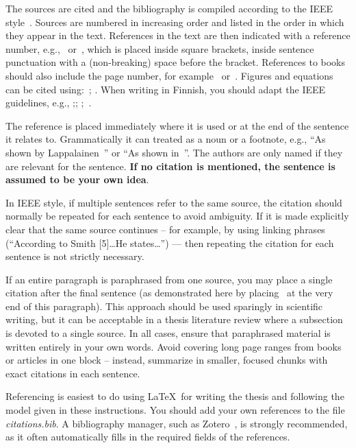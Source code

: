 The sources are cited and the bibliography is compiled according to
the IEEE style~\cite{ieeetransactions}.  Sources are numbered in
increasing order and listed in the order in which they appear in the
text.  References in the text are then indicated with a reference
number, e.g.,~\cite{lappalainen} or~\cite{lappalainen, acta, korpela},
which is placed inside square brackets, inside sentence punctuation
with a (non-breaking) space before the bracket. References to books
should also include the page number, for
example~\cite[p.~15]{lappalainen} or~\cite[pp.~15--17]{lappalainen}.
Figures and equations can be cited using:~\cite[Fig.~3]{lappalainen};
\cite[eq.~(3)]{lappalainen}. When writing in Finnish, you should adapt the IEEE guidelines, e.g., \cite[s.~15]{lappalainen};\cite[s.~15--17]{lappalainen};
\cite[Kuva~3]{lappalainen};~\cite[Yhtälö~(3)]{lappalainen}.

The reference is placed immediately where it is used or at the end of
the sentence it relates to. Grammatically it can treated as a noun or
a footnote, e.g., ``As shown by Lappalainen~\cite{lappalainen}'' or
``As shown in~\cite{lappalainen}''. The authors are only named if they
are relevant for the sentence. \textbf{If no citation is mentioned,
the sentence is assumed to be your own idea}.

In IEEE style, if multiple sentences refer to the same source, the
citation should normally be repeated for each sentence to avoid
ambiguity. If it is made explicitly clear that the same source
continues -- for example, by using linking phrases (“According to Smith
[5]\ldots He states\ldots”) — then repeating the citation for each
sentence is not strictly necessary.

If an entire paragraph is paraphrased from one source, you may place a
single citation after the final sentence (as demonstrated here by
placing~\cite{lappalainen} at the very end of this paragraph). This
approach should be used sparingly in scientific writing, but it can be
acceptable in a thesis literature review where a subsection is devoted
to a single source. In all cases, ensure that paraphrased material is
written entirely in your own words. Avoid covering long page ranges
from books or articles in one block -- instead, summarize in smaller,
focused chunks with exact citations in each
sentence.~\cite{lappalainen}

Referencing is easiest to do using \LaTeX\ for writing the thesis and
following the model given in these instructions. You should add your
own references to the file \textit{citations.bib}. A bibliography
manager, such as Zotero~\cite{zotero,uniouluzotero}, is strongly
recommended, as it often automatically fills in the required fields
of the references. 


